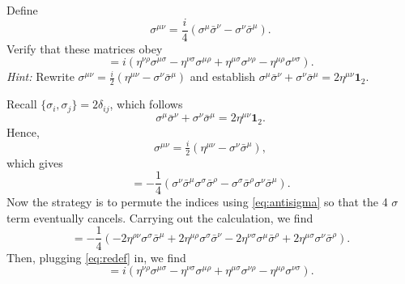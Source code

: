 Define
\begin{equation}
    \sigma^{\mu\nu}
    =\frac{i}{4}(\sigma^\mu\bar\sigma^\nu
    -\sigma^\nu\bar\sigma^\mu).
\end{equation}
Verify that these matrices obey
\begin{equation}
    [\sigma^{\mu\nu},\sigma^{\rho\sigma}]
    =i\left(\eta^{\nu\rho}\sigma^{\mu\sigma}
    -\eta^{\nu\sigma}\sigma^{\mu\rho}
    +\eta^{\mu\sigma}\sigma^{\nu\rho}
    -\eta^{\mu\rho}\sigma^{\nu\sigma}\right).
\end{equation}
\textit{Hint:} Rewrite $\sigma^{\mu\nu}
=\tfrac i2(\eta^{\mu\nu}-\sigma^\nu\bar\sigma^\mu)$ and
establish
$\sigma^\mu\bar\sigma^\nu
+\sigma^\nu\bar\sigma^\mu=2\eta^{\mu\nu}\mathbf1_2$.
\begin{solution}
    Recall $\{\sigma_i,\sigma_j\} = 2\delta_{ij}$, which follows
    \begin{equation}
        \sigma^\mu\bar\sigma^\nu
+\sigma^\nu\bar\sigma^\mu=2\eta^{\mu\nu}\mathbf1_2.
\label{eq:antisigma}
    \end{equation}
    Hence,
    \begin{equation}
        \sigma^{\mu\nu}
=\tfrac i2(\eta^{\mu\nu}-\sigma^\nu\bar\sigma^\mu),
\label{eq:redef}
    \end{equation}
    which gives
    \begin{equation}
        [\sigma^{\mu\nu},\sigma^{\rho\sigma}] = -\frac{1}{4}(\sigma^\nu\bar\sigma^\mu\sigma^\sigma\bar\sigma^\rho - \sigma^\sigma\bar\sigma^\rho\sigma^\nu\bar\sigma^\mu).
    \end{equation}
    Now the strategy is to permute the indices using \eqref{eq:antisigma} so that the 4 $\sigma$ term eventually cancels. Carrying out the calculation, we find
    \begin{equation}
        [\sigma^{\mu\nu},\sigma^{\rho\sigma}] = -\frac{1}{4}\left(-2\eta^{\rho\nu}\sigma^\sigma \bar \sigma^\mu + 2\eta^{\mu\rho}\sigma^\sigma \bar \sigma^\nu - 2\eta^{\nu\sigma}\sigma^\mu \bar \sigma^\rho + 2\eta^{\mu\sigma}\sigma^\nu \bar \sigma^\rho\right).
    \end{equation}
    Then, plugging \eqref{eq:redef} in, we find
    \begin{equation}
            [\sigma^{\mu\nu},\sigma^{\rho\sigma}]
    =i\left(\eta^{\nu\rho}\sigma^{\mu\sigma}
    -\eta^{\nu\sigma}\sigma^{\mu\rho}
    +\eta^{\mu\sigma}\sigma^{\nu\rho}
    -\eta^{\mu\rho}\sigma^{\nu\sigma}\right).
    \end{equation}
\end{solution}

